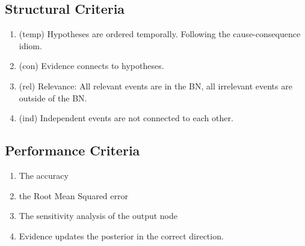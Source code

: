 \subsection{Structural Criteria}
\begin{enumerate}
\item (temp) Hypotheses are ordered temporally. Following the cause-consequence idiom.
\item (con) Evidence connects to hypotheses.
\item (rel) Relevance: All relevant events are in the BN, all irrelevant events are outside of the BN.
\item (ind) Independent events are not connected to each other.
\end{enumerate}

\subsection{Performance Criteria}
\begin{enumerate}
\item The accuracy 
\item the Root Mean Squared error
\item The sensitivity analysis of the output node
\item Evidence updates the posterior in the correct direction.


\end{enumerate}

